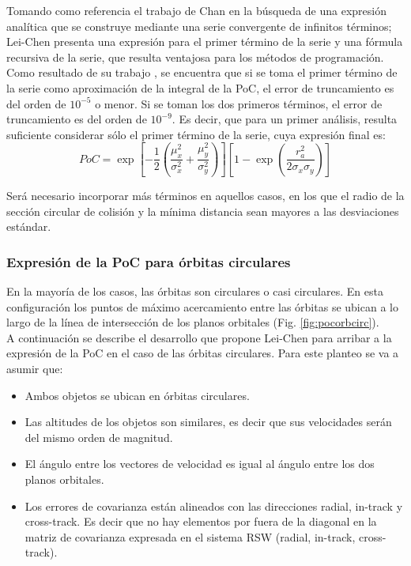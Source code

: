 Tomando como referencia el trabajo de Chan \citep{chan2003improved} en la b\'usqueda de una expresi\'on anal\'itica que se construye mediante una serie convergente de infinitos t\'erminos; Lei-Chen presenta una expresi\'on para el primer t\'ermino de la serie y una f\'ormula recursiva de la serie, que resulta ventajosa para los m\'etodos de programaci\'on.\\

Como resultado de su trabajo \citep{lei2009rapid}, se encuentra que si se toma el primer t\'ermino de la serie como aproximaci\'on de la integral de la PoC,  el error de truncamiento es del orden de $10^{-5}$ o menor. Si se toman los dos primeros t\'erminos, el error de truncamiento es del orden de $10^{-9}$. Es decir, que para un primer an\'alisis, resulta suficiente considerar s\'olo el primer t\'ermino de la serie, cuya expresi\'on final es:\\


\begin{equation}
 PoC= \exp[-\frac{1}{2}(\frac{\mu_{x}^{2}}{\sigma_{x}^{2}}+\frac{\mu_{y}^{2}}{\sigma_{y}^{2}})][1-\exp(\frac{r_{a}^{2}}{2\sigma_{x}\sigma_{y}})]
 \label{eq:pocexpress}
\end{equation}

Ser\'a necesario incorporar m\'as t\'erminos en aquellos casos, en los que el radio de la secci\'on circular de colisi\'on y la m\'inima distancia sean mayores a las desviaciones est\'andar.

\subsubsection*{Expresi\'on de la PoC para \'orbitas circulares}

En la mayor\'ia de los casos, las \'orbitas son circulares o casi circulares. En esta configuraci\'on  los puntos de m\'aximo acercamiento entre las \'orbitas se ubican a lo largo de la l\'inea de intersecci\'on de los planos orbitales (Fig. \ref{fig:pocorbcirc}).\\ 

A continuaci\'on se describe el desarrollo que propone Lei-Chen para arribar a la expresi\'on de la PoC en el caso de las \'orbitas circulares. Para este planteo se va a asumir que:

\begin{itemize}
 \item Ambos objetos se ubican en \'orbitas circulares.
 \item Las altitudes de los objetos son similares, es decir que sus velocidades ser\'an del mismo orden de magnitud.
 \item El \'angulo entre los vectores de velocidad es igual al \'angulo entre los dos planos orbitales.
 \item Los errores de covarianza est\'an alineados con las direcciones radial, in-track y cross-track. Es decir que no hay elementos por fuera de la diagonal en la matriz de covarianza expresada en el sistema RSW (radial, in-track, cross-track).
\end{itemize}

